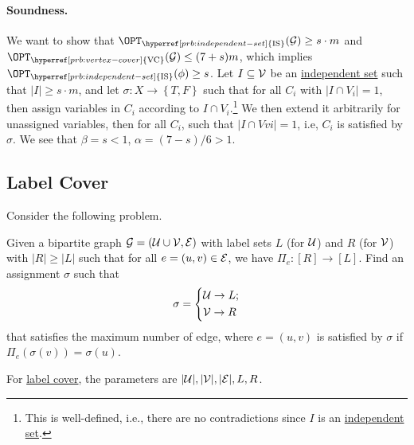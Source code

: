\paragraph*{Soundness.}
We want to show that \(\OPT_{\hyperref[prb:independent-set]{\text{IS}} }(\mathcal{\MakeUppercase{g}} ) \geq s\cdot m\) and \(\OPT_{\hyperref[prb:vertex-cover]{\text{VC}} }(\mathcal{\MakeUppercase{g}} ) \leq (7+s)m\), which implies \(\OPT_{\hyperref[prb:independent-set]{\text{IS}} }(\phi) \geq s\). Let \(I \subseteq \mathcal{\MakeUppercase{v}} \) be an \hyperref[def:independent-set]{independent set} such that \(\vert I \vert \geq s\cdot m\), and let \(\sigma \colon X \to \left\{ T, F \right\} \) such that for all \(C_i\) with \(\vert I \cap V_i \vert = 1\), then assign variables in \(C_i\) according to \(I \cap V_i\).\footnote{This is well-defined, i.e., there are no contradictions since \(I\) is an \hyperref[def:independent-set]{independent set}.} We then extend it arbitrarily for unassigned variables, then for all \(C_i\), such that \(\vert I \cap  Vvi \vert = 1\), i.e, \(C_i\) is satisfied by \(\sigma \). We see that \(\beta = s < 1\), \(\alpha = (7-s) / 6 > 1\).

\subsection{Label Cover}
Consider the following problem.

\begin{problem}\label{prb:label-cover}
Given a bipartite graph \(\mathcal{\MakeUppercase{g}} =(\mathcal{\MakeUppercase{u}} \cup \mathcal{\MakeUppercase{v}} , \mathcal{\MakeUppercase{e}} )\) with label sets \(L\) (for \(\mathcal{\MakeUppercase{u}} \)) and \(R\) (for \(\mathcal{\MakeUppercase{v}} \)) with \(\vert R \vert \geq \vert L \vert \) such that for all \(e=(u, v)\in \mathcal{\MakeUppercase{e}} \), we have \(\Pi _e \colon [R]\to [L]\). Find an assignment \(\sigma \) such that
\[
	\sigma = \begin{dcases}
		\mathcal{\MakeUppercase{u}} \to L; \\
		\mathcal{\MakeUppercase{v}} \to R
	\end{dcases}
\]
that satisfies the maximum number of edge, where \(e=(u, v)\) is satisfied by \(\sigma \) if \(\Pi _e(\sigma (v)) = \sigma (u)\).
\end{problem}

For \hyperref[prb:label-cover]{label cover}, the parameters are \(\vert \mathcal{\MakeUppercase{u}}  \vert, \vert \mathcal{\MakeUppercase{v}}  \vert , \vert \mathcal{\MakeUppercase{e}}  \vert , L, R\).

